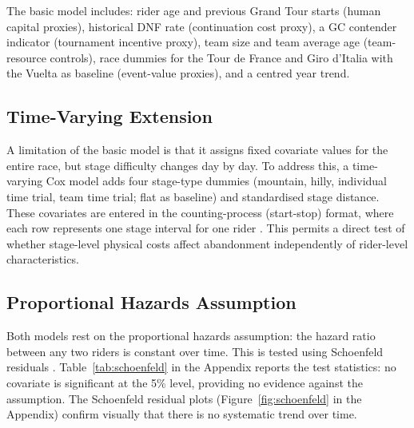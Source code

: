 The basic model includes: rider age and previous Grand Tour starts (human capital proxies), historical DNF rate (continuation cost proxy), a GC contender indicator (tournament incentive proxy), team size and team average age (team-resource controls), race dummies for the Tour de France and Giro d'Italia with the Vuelta as baseline (event-value proxies), and a centred year trend.

\subsection{Time-Varying Extension}

A limitation of the basic model is that it assigns fixed covariate values for the entire race, but stage difficulty changes day by day. To address this, a time-varying Cox model adds four stage-type dummies (mountain, hilly, individual time trial, team time trial; flat as baseline) and standardised stage distance. These covariates are entered in the counting-process (start-stop) format, where each row represents one stage interval for one rider \parencite{cleves2010survival}. This permits a direct test of whether stage-level physical costs affect abandonment independently of rider-level characteristics.

\subsection{Proportional Hazards Assumption}

Both models rest on the proportional hazards assumption: the hazard ratio between any two riders is constant over time. This is tested using Schoenfeld residuals \parencite{schoenfeld1982residuals}. Table~\ref{tab:schoenfeld} in the Appendix reports the test statistics: no covariate is significant at the 5\% level, providing no evidence against the assumption. The Schoenfeld residual plots (Figure~\ref{fig:schoenfeld} in the Appendix) confirm visually that there is no systematic trend over time.
